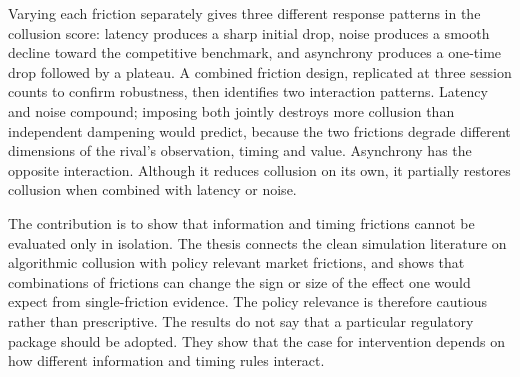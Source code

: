 Varying each friction separately gives three different response patterns in the collusion score: latency produces a sharp initial drop, noise produces a smooth decline toward the competitive benchmark, and asynchrony produces a one-time drop followed by a plateau. A combined friction design, replicated at three session counts to confirm robustness, then identifies two interaction patterns. Latency and noise compound; imposing both jointly destroys more collusion than independent dampening would predict, because the two frictions degrade different dimensions of the rival's observation, timing and value. Asynchrony has the opposite interaction. Although it reduces collusion on its own, it partially restores collusion when combined with latency or noise.

The contribution is to show that information and timing frictions cannot be evaluated only in isolation. The thesis connects the clean simulation literature on algorithmic collusion with policy relevant market frictions, and shows that combinations of frictions can change the sign or size of the effect one would expect from single-friction evidence. The policy relevance is therefore cautious rather than prescriptive. The results do not say that a particular regulatory package should be adopted. They show that the case for intervention depends on how different information and timing rules interact.
